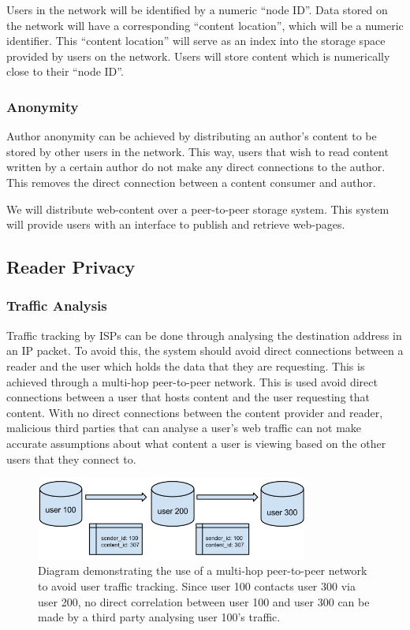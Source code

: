 Users in the network will be identified by a numeric ``node ID''. Data stored on the network will have a
corresponding ``content location'', which will be a numeric identifier. This ``content location'' will
serve as an index into the storage space provided by users on the network. Users will store content which
is numerically close to their ``node ID''.

\subsubsection{Anonymity}

Author anonymity can be achieved by distributing an author's content to be stored by other users in the network.
This way, users that wish to read content written by a certain author do not make any direct connections to
the author. This removes the direct connection between a content consumer and author.

We will distribute web-content over a peer-to-peer storage system. This system will provide users with an
interface to publish and retrieve web-pages.


\subsection{Reader Privacy}

\subsubsection{Traffic Analysis}

Traffic tracking by ISPs can be done through analysing the destination address in an IP packet. To avoid this,
the system should avoid direct connections between a reader and the user which holds the data that they are
requesting. This is achieved through a multi-hop peer-to-peer network. This is used avoid direct connections
between a user that hosts content and the user requesting that content. With no direct connections between
the content provider and reader, malicious third parties that can analyse a user's web traffic can not make
accurate assumptions about what content a user is viewing based on the other users that they connect to.

\begin{figure}[H]
    \centering
    \includegraphics[width=0.8\textwidth]{img/indirection.png}
    \caption{Diagram demonstrating the use of a multi-hop peer-to-peer network to avoid user traffic tracking.
    Since user 100 contacts user 300 via user 200, no direct correlation between user 100 and user 300 can be made
by a third party analysing user 100's traffic.}
    \label{fig:multi-hop}
\end{figure}

